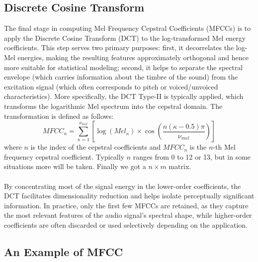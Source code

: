 \subsection{Discrete Cosine Transform}
The final stage in computing Mel Frequency Cepstral Coefficients (MFCCs) is to apply the Discrete Cosine Transform (DCT) to the log-transformed Mel energy coefficients. This step serves two primary purposes: first, it decorrelates the log-Mel energies, making the resulting features approximately orthogonal and hence more suitable for statistical modeling; second, it helps to separate the spectral envelope (which carries information about the timbre of the sound) from the excitation signal (which often corresponds to pitch or voiced/unvoiced characteristics). More specifically, the DCT Type-II is typically applied, which transforms the logarithmic Mel spectrum into the cepstral domain. The transformation is defined as follows:\\
\begin{equation}
	MFCC_n=\sum_{\kappa=1}^{\nu_{mel}}[\log(Mel_{\kappa})\times \cos(\frac{n(\kappa-0.5)\pi}{\nu_{mel}})]
\end{equation}
where $n$ is the index of the cepstral coefficients and $MFCC_n$ is the $n$-th Mel frequency cepstral coefficient. Typically $n$ ranges from 0 to 12 or 13, but in some situations more will be taken. Finally we got a $n \times m$ matrix.\\
\\
By concentrating most of the signal energy in the lower-order coefficients, the DCT facilitates dimensionality reduction and helps isolate perceptually significant information. In practice, only the first few MFCCs are retained, as they capture the most relevant features of the audio signal's spectral shape, while higher-order coefficients are often discarded or used selectively depending on the application.\\
\subsection{An Example of MFCC}


